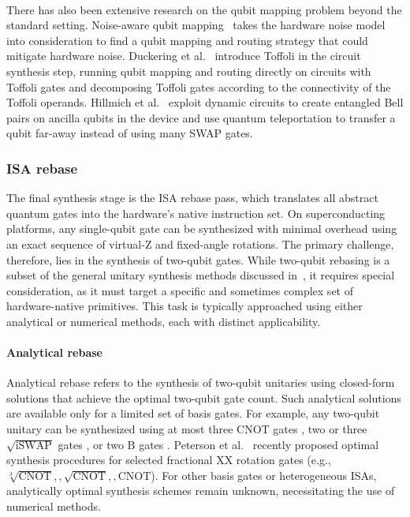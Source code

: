 \documentclass[a4paper,onecolumn,11pt,unpublished]{quantumarticle}
\begin{document}
\paragraph*{}There has also been extensive research on the qubit mapping problem beyond the standard setting. Noise-aware qubit mapping~\cite{Murali2020Software, Murali2019NoiseAdaptive, Tannu2019Not, Tannu2019Ensemble} takes the hardware noise model into consideration to find a qubit mapping and routing strategy that could mitigate hardware noise. Duckering et al.~\cite{Duckering2021Orchestrated} introduce Toffoli in the circuit synthesis step, running qubit mapping and routing directly on circuits with Toffoli gates and decomposing Toffoli gates according to the connectivity of the Toffoli operands. Hillmich et al.~\cite{Hillmich2021Exploiting} exploit dynamic circuits to create entangled Bell pairs on ancilla qubits in the device and use quantum teleportation to transfer a qubit far-away instead of using many SWAP gates.


\subsubsection{ISA rebase}


The final synthesis stage is the ISA rebase pass, which translates all abstract quantum gates into the hardware's native instruction set. On superconducting platforms, any single-qubit gate can be synthesized with minimal overhead using an exact sequence of virtual-Z and fixed-angle rotations. The primary challenge, therefore, lies in the synthesis of two-qubit gates. While two-qubit rebasing is a subset of the general unitary synthesis methods discussed in~, it requires special consideration, as it must target a specific and sometimes complex set of hardware-native primitives. This task is typically approached using either analytical or numerical methods, each with distinct applicability.



\paragraph{Analytical rebase}
Analytical rebase refers to the synthesis of two-qubit unitaries using closed-form solutions that achieve the optimal two-qubit gate count. Such analytical solutions are available only for a limited set of basis gates. For example, any two-qubit unitary can be synthesized using at most three CNOT gates \cite{Vidal2004Universal}, two or three $\sqrt{\mathrm{iSWAP}}$ gates \cite{Huang2023Quantum}, or two B gates \cite{zhang2004minimum}. Peterson et al.~\cite{Peterson2022OptimalSynthesis} recently proposed optimal synthesis procedures for selected fractional $\mathrm{XX}$ rotation gates (e.g., ${\sqrt[3]{\mathrm{CNOT}},,\sqrt{\mathrm{CNOT}},,\mathrm{CNOT}}$). For other basis gates or heterogeneous ISAs, analytically optimal synthesis schemes remain unknown, necessitating the use of numerical methods.
\end{document}
